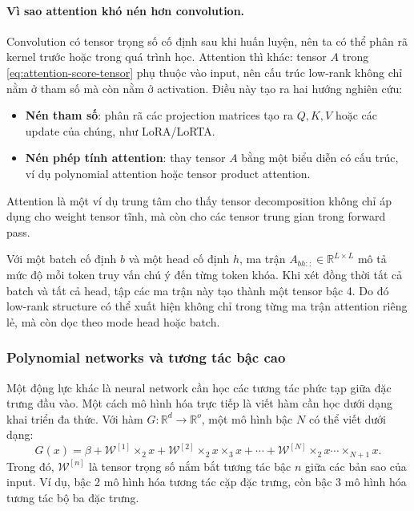 \paragraph{Vì sao attention khó nén hơn convolution.}
Convolution có tensor trọng số cố định sau khi huấn luyện, nên ta có thể phân rã kernel
trước hoặc trong quá trình học. Attention thì khác: tensor $A$ trong
\eqref{eq:attention-score-tensor} phụ thuộc vào input, nên cấu trúc low-rank không chỉ
nằm ở tham số mà còn nằm ở activation. Điều này tạo ra hai hướng nghiên cứu:
\begin{itemize}[leftmargin=2em]
    \item \textbf{Nén tham số}: phân rã các projection matrices tạo ra $Q,K,V$ hoặc các
    update của chúng, như LoRA/LoRTA.
    \item \textbf{Nén phép tính attention}: thay tensor $A$ bằng một biểu diễn có cấu
    trúc, ví dụ polynomial attention hoặc tensor product attention.
\end{itemize}
Attention là một ví dụ trung tâm cho thấy tensor decomposition không chỉ áp dụng cho
weight tensor tĩnh, mà còn cho các tensor trung gian trong forward pass.

\begin{example}
Với một batch cố định $b$ và một head cố định $h$, ma trận
$A_{bh::} \in \mathbb{R}^{L \times L}$ mô tả mức độ mỗi token truy vấn chú ý đến từng
token khóa. Khi xét đồng thời tất cả batch và tất cả head, tập các ma trận này tạo thành
một tensor bậc 4. Do đó low-rank structure có thể xuất hiện không chỉ trong từng ma
trận attention riêng lẻ, mà còn dọc theo mode head hoặc batch.
\end{example}

\subsubsection{Polynomial networks và tương tác bậc cao}

Một động lực khác là neural network cần học các tương tác phức tạp giữa đặc trưng đầu
vào. Một cách mô hình hóa trực tiếp là viết hàm cần học dưới dạng khai
triển đa thức. Với hàm $G:\mathbb{R}^{d}\rightarrow\mathbb{R}^{o}$, một mô hình bậc
$N$ có thể viết dưới dạng:
\begin{equation}
    G(x) =
    \beta
    + \mathcal{W}^{[1]} \times_2 x
    + \mathcal{W}^{[2]} \times_2 x \times_3 x
    + \cdots
    + \mathcal{W}^{[N]} \times_2 x \cdots \times_{N+1} x.
    \label{eq:polynomial-network}
\end{equation}
Trong đó, $\mathcal{W}^{[n]}$ là tensor trọng số nắm bắt tương tác bậc $n$ giữa các bản
sao của input. Ví dụ, bậc 2 mô hình hóa tương tác cặp đặc trưng, còn bậc 3 mô hình hóa
tương tác bộ ba đặc trưng.

